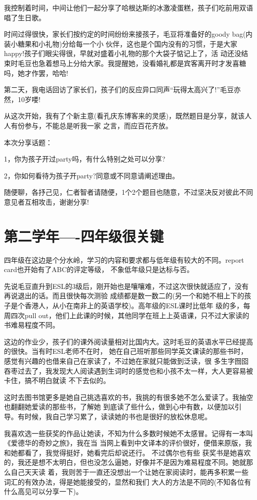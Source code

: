 \documentclass[11pt,a4paper,onecolumn]{article}
\begin{document}
我控制着时间，中间让他们一起分享了哈根达斯的冰激凌蛋糕，孩子们吃前用双语唱了生日歌。

时间过得很快，家长们按约定的时间纷纷来接孩子，毛豆将准备好的goody bag(内装小糖果和小礼物)分给每一个小
伙伴，这也是个国内没有的习惯，于是大家happy!孩子们眼尖得很，早就对盛着小礼物的那个大袋子惦记上了，活
动还没结束时毛豆也急着想马上分给大家。我提醒她，没看婚礼都是宾客离开时才发喜糖吗，她才作罢，哈哈!

第二天，我电话回访了家长们，孩子们的反应异口同声``玩得太高兴了!''毛豆亦然，10岁喽!


从这次开始，我有了个新主意(看孔庆东博客来的灵感)，既然题目是分享，就该人人有份参与，不能总是听我一家
之言，而应百花齐放。

本次分享话题：

1，你为孩子开过party吗，有什么特别之处可以分享?

2，你如何看待为孩子开party?同意或不同意请阐述理由。

随便聊，各抒己见，仁者智者请随便，1个2个题目也随意，不过坚决反对彼此不同意见者互相攻击，谢谢分享!

\section{第二学年----四年级很关键}


四年级在这边是个分水岭，学习的内容和要求都与低年级有较大的不同。report card也开始有了ABC的评定等级，
不象低年级只是达标与否。


先说毛豆直升到ESL的3级后，刚开始也是嚷嚷难，不过这次很快就适应了，没有再说退出的话。而且很快每次测验
成绩都是数一数二的(另一个和她不相上下的孩子是个香港人，从小在南非上的英语学校)。高年级的ESL课时比低年
级的多，每周四次pull out，他们上此课的时候，其他同学在班上上英语课，只不过大家读的书难易程度不同。


这边的作业少，孩子们的课外阅读量相对比国内大。这时毛豆的英语水平已经提高的很快。当有时ESL老师不在时，
她在自己班听那些同学英文课读的那些书时，感觉有兴趣的也借来自己在家读了，不过她在家就只能做到泛读，很
多生字囫囵吞枣过去了，我发现大人阅读遇到生词时的感觉也和小孩不太一样，大人更容易被卡住，搞不明白就读
不下去似的。


这时去图书馆更多是她自己挑选喜欢的书，我挑的有很多她不怎么爱读了。我抽空也翻翻她爱读的那些书，了解她
到底读了些什么，做到心中有数，以便加以引导。有时候，我自己学习累了，读读她的书也是很好的放松休息呢。


我喜欢选一些获奖的作品让她读，不知为什么多数时候她不太感冒。记得有一本叫《爱德华的奇妙之旅》，我在当
当网上看到中文译本的评价很好，便借来原版，我和她都看了，我觉得挺好，她看完后却说还行。 不过偶尔也有些
获奖书是她喜欢的，我还是想不太明白，但也没怎么逼她，好像并不是因为难易程度不同。她就那么自己天天读
着，我则苦于一直还没想出一个让她在家阅读时，能再多积累一些词汇的有效办法，得是她能接受的，显然和我们
大人的方法是不同的(不知各位有什么高见可以分享一下)。
\end{document}
